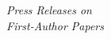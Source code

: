 \documentclass[11pt]{article}
\begin{document}
\hspace{2.5mm} \parbox{1.5in}{\textit{Press Releases on \\ First-Author Papers \\ \\ \\ \\ \\  \\ \\ \\ \\ \\ \\ \\ \\ \\ \\ \\ \\ \\ \\ \\ \\ \\ \\ \\ \\  }}
\end{document}
